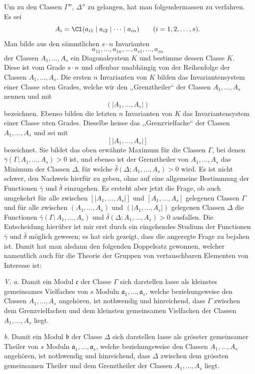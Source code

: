 Um zu den Classen $\Gamma''$, $\Delta''$ zu gelangen, hat man folgendermassen zu verfahren. Es sei
\[
 A_i=\Cl(a_{i1}\mid a_{i2}\mid\cdots\mid a_{in})\qquad (i=1,2,\ldots,s).
\]
Man bilde aus den sämmtlichen $s\cdot n$ Invarianten
\[
 a_{11},\ldots,a_{1n},\ldots,a_{s1},\ldots,a_{sn}
\]
der Classen $A_1,\ldots,A_s$ ein Diagonalsystem $K$ und bestimme dessen Classe $K$. Diese ist vom Grade $s\cdot n$ und offenbar unabhängig von der Reihenfolge der Classen $A_1,\ldots,A_s$. Die ersten $n$ Invarianten von $K$ bilden das Invariantensystem einer Classe $n$ten Grades, welche wir den ,,Grenztheiler`` der Classen $A_1,\ldots,A_s$ nennen und mit
\[
 (\!|A_1,\ldots,A_s|\!)
\]
bezeichnen. Ebenso bilden die letzten $n$ Invarianten von $K$ das Invariantensystem einer Classe $n$ten Grades. Dieselbe heisse das ,,Grenzvielfache`` der Classen $A_1,\ldots,A_s$ und sei mit
\[
 [\!|A_1,\ldots,A_s|\!]
\]
bezeichnet. Sie bildet das oben erwähnte Maximum für die Classen $\Gamma$, bei denen $\bar\gamma(\Gamma;A_1,\ldots,A_s)>0$ ist, und ebenso ist der Grenztheiler von $A_1,\ldots,A_s$ das Minimum der Classen $\Delta$, für welche $\bar\delta(\Delta;A_1,\ldots,A_s)>0$ wird. Es ist nicht schwer, den Nachweis hierfür zu geben, ohne auf eine allgemeine Bestimmung der Functionen $\bar\gamma$ und $\bar\delta$ einzugehen. Es ersteht aber jetzt die Frage, ob auch umgekehrt für alle zwischen $[\!|A_1,\ldots,A_s|\!]$ und $[A_1,\ldots,A_s]$ gelegenen Classen $\Gamma$ und für alle zwischen $(A_1,\ldots,A_s)$ und $(\!|A_1,\ldots,A_s|\!)$ gelegenen Classen $\Delta$ die Functionen $\bar\gamma(\Gamma;A_1,\ldots,A_s)$ und $\bar\delta(\Delta;A_1,\ldots,A_s)>0$ ausfallen. Die Entscheidung hierüber ist mir erst durch ein eingehendes Studium der Functionen $\bar\gamma$ und $\bar\delta$ möglich gewesen; es hat sich gezeigt, dass die angeregte Frage zu bejahen ist. Damit hat man alsdann den folgenden Doppelsatz gewonnen, welcher namentlich auch für die Theorie der Gruppen von vertauschbaren Elementen von Interesse ist:

\emph{V. a.} Damit ein Modul $\mathfrak c$ der Classe $\Gamma$ sich darstellen lasse als kleinstes gemeinsames Vielfaches von $s$ Moduln $\mathfrak a_1,\ldots,\mathfrak a_s$, welche beziehungsweise den Classen $A_1,\ldots,A_s$ angehören, ist nothwendig und hinreichend, dass $\Gamma$ zwischen dem Grenzvielfachen und dem kleinsten gemeinsamen Vielfachen der Classen $A_1,\ldots,A_s$ liegt.

\emph{b.} Damit ein Modul $\mathfrak b$ der Classe $\Delta$ sich darstellen lasse als grösster gemeinsamer Theiler von $s$ Moduln $\mathfrak a_1,\ldots,\mathfrak a_s$, welche beziehungsweise den Classen $A_1,\ldots,A_s$ angehören, ist nothwendig und hinreichend, dass $\Delta$ zwischen dem grössten gemeinsamen Theiler und dem Grenztheiler der Classen $A_1,\ldots,A_s$ liegt.

